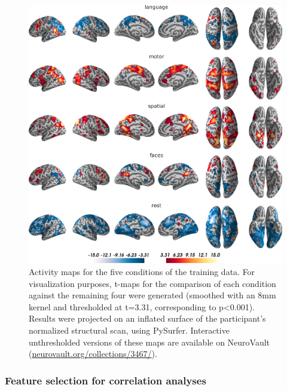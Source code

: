 \documentclass[fleqn,10pt]{SelfArx} %
\begin{document}
\begin{figure}[htbp]
	\begin{minipage}{\textwidth}
		\renewcommand{\familydefault}{\sfdefault}\normalfont
		\centering
		\includegraphics[width=\columnwidth]{./figs/fig2_tMapTrainBrains.png}
				\vspace*{-3mm}
		\caption{Activity maps for the five conditions of the training data. For visualization purposes, t-maps for the comparison of each condition against the remaining four were generated (smoothed with an 8mm kernel and thresholded at t=3.31, corresponding to p<0.001). Results were projected on an inflated surface of the participant's normalized structural scan, using PySurfer. Interactive unthresholded versions of these maps are available on NeuroVault (\href{https://neurovault.org/collections/3467/}{neurovault.org/collections/3467/}).}%
		\label{fig:trainBrains}
	\end{minipage}
\end{figure}

\subsubsection*{Feature selection for correlation analyses}
\end{document}
